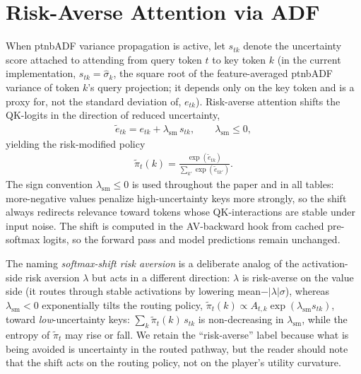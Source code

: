 \section{Risk-Averse Attention via ADF}\label{ptnb:app:risk-attn}

When \ac{ptnbADF} variance propagation is active, let $s_{tk}$ denote the uncertainty score attached to
attending from query token $t$ to key token $k$ (in the current implementation, $s_{tk} =
    \hat{\sigma}_k$, the square root of the feature-averaged \ac{ptnbADF} variance of token $k$'s query
projection; it depends only on the key token and is a proxy for, not the standard deviation of,
$e_{tk}$). Risk-averse attention shifts the QK-logits in the direction of reduced uncertainty,
\begin{align}\label{ptnb:eq:risk-attn-policy}
    \tilde e_{tk} = e_{tk} + \lambda_{\mathrm{sm}}\, s_{tk},
    \qquad \lambda_{\mathrm{sm}} \le 0,
\end{align}
yielding the risk-modified policy
\begin{align}\label{ptnb:eq:risk-attn-policy-softmax}
    \tilde{\pi}_t(k) = \frac{\exp(\tilde e_{tk})}{\sum_{k'} \exp(\tilde e_{tk'})}.
\end{align}
The sign convention $\lambda_{\mathrm{sm}} \le 0$ is used throughout the paper and in all tables:
more-negative values penalize high-uncertainty keys more strongly, so the shift always redirects
relevance toward tokens whose QK-interactions are stable under input noise. The shift is computed
in the AV-backward hook from cached pre-softmax logits, so the forward pass and model predictions
remain unchanged.

The naming \emph{softmax-shift risk aversion} is a deliberate analog of the activation-side risk
aversion $\lambda$ but acts in a different direction: $\lambda$ is risk-averse on the value side
(it routes through stable activations by lowering mean$-|\lambda|\sigma$), whereas
$\lambda_{\mathrm{sm}}<0$ exponentially tilts the routing policy, $\tilde\pi_t(k) \propto
    A_{t,k}\exp(\lambda_{\mathrm{sm}} s_{tk})$, toward \emph{low}-uncertainty keys: $\sum_k
    \tilde\pi_t(k)\, s_{tk}$ is non-decreasing in $\lambda_{\mathrm{sm}}$, while the entropy of
$\tilde\pi_t$ may rise or fall. We retain the ``risk-averse'' label because what is being avoided
is uncertainty in the routed pathway, but the reader should note that the shift acts on the routing
policy, not on the player's utility curvature.

